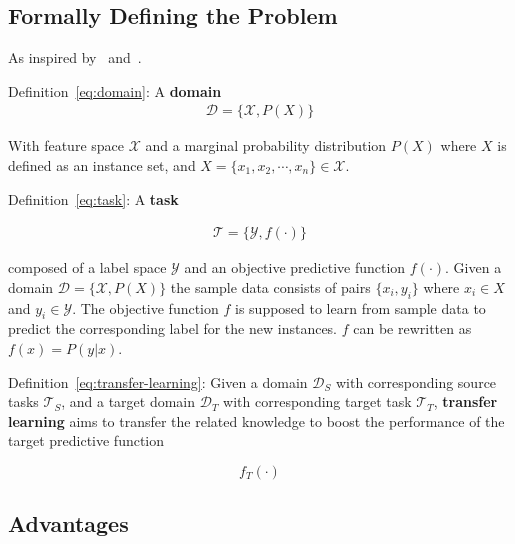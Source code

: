\documentclass[11pt]{article}
\begin{document}
\subsection{Formally Defining the Problem}

As inspired by~\cite{concise-review-of-transfer-learning} and~\cite{survey-on-transfer-learning}.

Definition~\ref{eq:domain}: A \textbf{domain} \begin{align}
    \mathcal{D} = \{\mathcal{X}, P(X)\}
    \label{eq:domain}
\end{align}

With feature space $\mathcal{X}$ and a marginal probability distribution $P(X)$ where $X$ is defined as an instance set, and $X = \{x_1, x_2, \cdots, x_n\} \in \mathcal{X}$.

\vspace{1em}

Definition~\ref{eq:task}: A \textbf{task}

\begin{align}
    \mathcal{T} = \{\mathcal{Y}, f(\cdot)\}
    \label{eq:task}
\end{align}

composed of a label space $\mathcal{Y}$ and an objective predictive function $f(\cdot)$. Given a domain $\mathcal{D} = \{\mathcal{X}, P(X)\}$ the sample data consists of pairs $\{x_i, y_i\}$ where $x_i \in X$ and $y_i \in \mathcal{Y}$. The objective function $f$ is supposed to learn from sample data to predict the corresponding label for the new instances. $f$ can be rewritten as $f(x)=P(y|x)$.

\vspace{1em}

Definition~\ref{eq:transfer-learning}: Given a domain $\mathcal{D}_S$ with corresponding source tasks $\mathcal{T}_S$, and a target domain $\mathcal{D}_T$ with corresponding target task $\mathcal{T}_T$, \textbf{transfer learning} aims to transfer the related knowledge to boost the performance of the target predictive function

\begin{equation}
    f_T(\cdot)
    \label{eq:transfer-learning}
\end{equation}

\subsection{Advantages}
\end{document}
